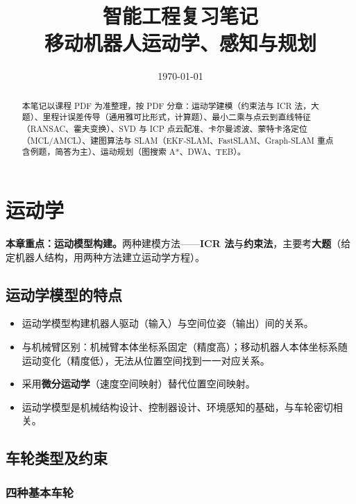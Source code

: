 \documentclass[11pt,a4paper]{article}
\title{\textbf{智能工程复习笔记}\\[0.3em]\large 移动机器人运动学、感知与规划}
\author{}
\date{\today}
\begin{document}
\maketitle
\thispagestyle{empty}

\begin{abstract}
本笔记以课程 PDF 为准整理，按 PDF 分章：运动学建模（约束法与 ICR 法，大题）、里程计误差传导（通用雅可比形式，计算题）、最小二乘与点云到直线特征（RANSAC、霍夫变换）、SVD 与 ICP 点云配准、卡尔曼滤波、蒙特卡洛定位（MCL/AMCL）、建图算法与 SLAM（EKF-SLAM、FastSLAM、Graph-SLAM 重点含例题，简答为主）、运动规划（图搜索 A*、DWA、TEB）。
\end{abstract}

\tableofcontents
\newpage

\section{运动学}

\begin{keypoint}
\textbf{本章重点：运动模型构建。}两种建模方法——\textbf{ICR 法}与\textbf{约束法}，主要考\textbf{大题}（给定机器人结构，用两种方法建立运动学方程）。
\end{keypoint}

\subsection{运动学模型的特点}

\begin{itemize}
  \item 运动学模型构建机器人驱动（输入）与空间位姿（输出）间的关系。
  \item 与机械臂区别：机械臂本体坐标系固定（精度高）；移动机器人本体坐标系随运动变化（精度低），无法从位置空间找到一一对应关系。
  \item 采用\textbf{微分运动学}（速度空间映射）替代位置空间映射。
  \item 运动学模型是机械结构设计、控制器设计、环境感知的基础，与车轮密切相关。
\end{itemize}

\subsection{车轮类型及约束}

\subsubsection{四种基本车轮}
\end{document}
